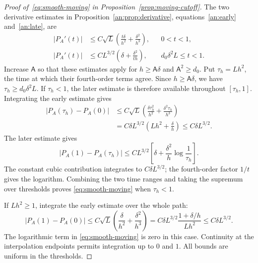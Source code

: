 \documentclass[11pt,letterpaper]{article}
\newcommand{\Ac}{\mathsf A}
\theoremstyle{remark}
\begin{document}
\begin{proof}[Proof of~\eqref{eq:smooth-moving} in
Proposition~\ref{prop:moving-cutoff}]
The two derivative estimates in Proposition~\ref{an:prop:derivative},
equations~\eqref{an:early} and~\eqref{an:late}, are
\[
 \begin{aligned}
 |P_A'(t)|&\le C\sqrt L\left(\frac{t\delta}{h^2}
                    +\frac{\delta^2}{h^3}\right),&&0<t<1,\\
 |P_A'(t)|&\le CL^{3/2}\left(\delta+\frac{\delta^2}{th}\right),
                    &&d_0\delta^2L\le t<1.
 \end{aligned}
\]
Increase \(\Ac\) so that these estimates apply for \(h\ge\Ac\delta\)
and \(\Ac^2\ge d_0\). Put \(\tau_h=Lh^2\), the time at which their
fourth-order terms agree. Since \(h\ge\Ac\delta\), we have
\(\tau_h\ge d_0\delta^2L\). If \(\tau_h<1\), the later estimate
is therefore available throughout \([\tau_h,1]\). Integrating the
early estimate gives
\begin{align*}
 |P_A(\tau_h)-P_A(0)|
 &\le C\sqrt L\left(
 \frac{\delta\tau_h^2}{h^2}
 +\frac{\delta^2\tau_h}{h^3}\right)\\
 &=C\delta L^{3/2}
 \left(Lh^2+\frac\delta h\right)
 \le C\delta L^{3/2}.
\end{align*}
The later estimate gives
\[
 |P_A(1)-P_A(\tau_h)|
 \le CL^{3/2}\left[
 \delta+\frac{\delta^2}{h}\log\frac1{\tau_h}\right].
\]
The constant cubic contribution integrates to \(C\delta L^{3/2}\);
the fourth-order factor \(1/t\) gives the logarithm. Combining
the two time ranges and taking the supremum over thresholds proves
\eqref{eq:smooth-moving} when \(\tau_h<1\).

If \(Lh^2\ge1\), integrate the early estimate over the whole path:
\[
 |P_A(1)-P_A(0)|
 \le C\sqrt L\left(\frac\delta{h^2}
 +\frac{\delta^2}{h^3}\right)
 =C\delta L^{3/2}\frac{1+\delta/h}{Lh^2}
 \le C\delta L^{3/2}.
\]
The logarithmic term in \eqref{eq:smooth-moving} is zero in this case.
Continuity at the interpolation endpoints permits integration up to
\(0\) and \(1\). All bounds are uniform in the thresholds.
\end{proof}
\end{document}
